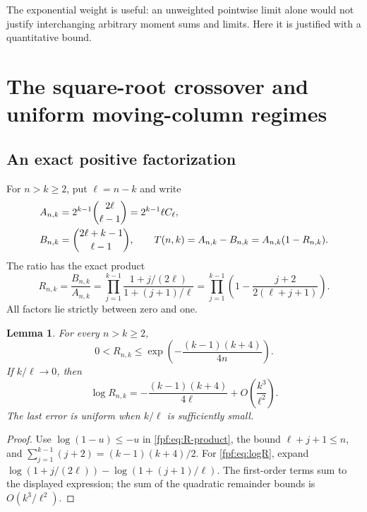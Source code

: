 \documentclass[11pt]{article}
\numberwithin{equation}{section}
\newtheorem{lemma}[theorem]{Lemma}
\theoremstyle{definition}
\begin{document}
The exponential weight is useful: an unweighted pointwise limit alone would
not justify interchanging arbitrary moment sums and limits. Here it is
justified with a quantitative bound.

\section{The square-root crossover and uniform moving-column regimes}

\subsection{An exact positive factorization}
For $n>k\ge2$, put $\ell=n-k$ and write
\begin{align}\label{fpf:eq:AB-split}
 A_{n,k}&=2^{k-1}\binom{2\ell}{\ell-1}=2^{k-1}\ell C_\ell,\notag\\
 B_{n,k}&=\binom{2\ell+k-1}{\ell-1},\qquad
 T(n,k)=A_{n,k}-B_{n,k}=A_{n,k}(1-R_{n,k}).
\end{align}
The ratio has the exact product
\begin{equation}\label{fpf:eq:R-product}
 R_{n,k}=\frac{B_{n,k}}{A_{n,k}}
 =\prod_{j=1}^{k-1}\frac{1+j/(2\ell)}{1+(j+1)/\ell}
 =\prod_{j=1}^{k-1}\left(1-\frac{j+2}{2(\ell+j+1)}\right).
\end{equation}
All factors lie strictly between zero and one.

\begin{lemma}\label{fpf:lem:R}
For every $n>k\ge2$,
\begin{equation}\label{fpf:eq:R-bound}
 0<R_{n,k}\le
 \exp\left(-\frac{(k-1)(k+4)}{4n}\right).
\end{equation}
If $k/\ell\to0$, then
\begin{equation}\label{fpf:eq:logR}
 \log R_{n,k}=-\frac{(k-1)(k+4)}{4\ell}
                  +O\left(\frac{k^3}{\ell^2}\right).
\end{equation}
The last error is uniform when $k/\ell$ is sufficiently small.
\end{lemma}
\begin{proof}
Use $\log(1-u)\le-u$ in \eqref{fpf:eq:R-product}, the bound
$\ell+j+1\le n$, and
$\sum_{j=1}^{k-1}(j+2)=(k-1)(k+4)/2$.
For \eqref{fpf:eq:logR}, expand
$\log(1+j/(2\ell))-\log(1+(j+1)/\ell)$.
The first-order terms sum to the displayed expression; the sum of the
quadratic remainder bounds is $O(k^3/\ell^2)$.
\end{proof}
\end{document}
